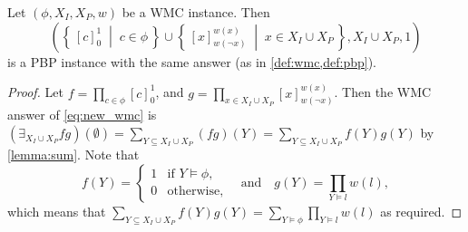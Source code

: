 \begin{proposition}\label{prop:equivalence}
  Let $(\phi, X_I, X_P, w)$ be a WMC instance. Then
  \begin{equation}
  \left( \left\{\, {[c]}_0^1 \;\middle|\; c \in \phi \,\right\} \cup \left\{\, {[x]}_{w(\neg x)}^{w(x)} \;\middle|\; x \in X_I \cup X_P \,\right\}, X_I \cup X_P, 1 \right) \label{eq:new_wmc}
  \end{equation}
  is a PBP instance with the same answer (as in \cref{def:wmc,def:pbp}).
\end{proposition}
\begin{proof}
  Let $f = \prod_{c \in \phi} {[c]}_0^1$, and
  $g = \prod_{x \in X_I \cup X_P} {[x]}_{w(\neg x)}^{w(x)}$. Then the WMC answer
  of \cref{eq:new_wmc} is
  $(\exists_{X_I \cup X_P} fg)(\emptyset) = \sum_{Y \subseteq X_I \cup X_P} (fg)(Y) = \sum_{Y \subseteq X_I \cup X_P} f(Y)g(Y)$
  by \cref{lemma:sum}. Note that
  \[
    f(Y) =
    \begin{cases}
      1 & \text{if } Y \models \phi, \\
      0 & \text{otherwise},
    \end{cases}
    \quad
    \text{and}
    \quad
    g(Y) = \prod_{Y \models l} w(l),
  \]
  which means that
  $\sum_{Y \subseteq X_I \cup X_P} f(Y)g(Y) = \sum_{Y \models \phi} \prod_{Y \models l} w(l)$
  as required.
\end{proof}

